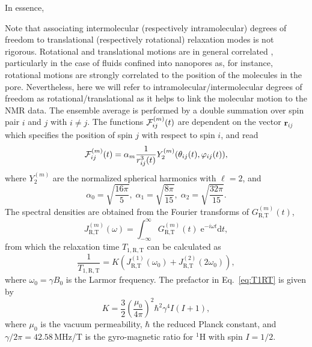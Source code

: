 In essence, 




Note that associating intermolecular (respectively intramolecular) 
degrees of freedom to translational (respectively rotational) relaxation modes
is not rigorous. Rotational and translational motions are in general correlated \cite{henritzi13a, becher21a, becher22a},
particularly in the case of fluids confined into nanopores as,
for instance, rotational motions are strongly correlated to the position of the 
molecules in the pore. Nevertheless, here we will refer to intramolecular/intermolecular
degrees of freedom as rotational/translational as it helps to link the molecular motion 
to the NMR data.
The ensemble average is performed by a double summation over spin pair $i$ and
$j$ with $i \ne j$.
The functions ${\cal F}_{ij}^{(m)} (t)$ are dependent on the vector
$\boldsymbol{r}_{ij}$ which specifies the position of spin $j$ with respect to
spin $i$, and read
\begin{equation}
{\cal F}_{ij}^{(m)} (t) = \alpha_m 
\dfrac{1}{r_{ij}^3 (t)}
Y^{(m)}_2 (\theta_{ij} (t), \varphi_{ij} (t)),
\label{eq:Fij}
\end{equation}
where $Y^{(m)}_2$ are the normalized spherical harmonics with $\ell = 2$, and
\begin{equation}
\alpha_0 = \sqrt{\dfrac{16 \pi}{5}}, \; \alpha_1 = \sqrt{\dfrac{8 \pi}{15}}, \;
\alpha_2 = \sqrt{\dfrac{32 \pi}{15}}.
\label{eq:alpha}
\end{equation}
The spectral densities are obtained from the Fourier transforms of $G^{(m)}_\text{R,T} (t)$,
\begin{equation}
J^{(m)}_\text{R,T} (\omega) = \int_{-\infty}^\infty G^{(m)}_\text{R,T} (t) \; 
\mathrm e^{-i \omega t} \mathrm d t,
\label{eq:JRT}
\end{equation}
from which the relaxation time $T_{1, \text{R}, \text{T}}$ can be calculated as
\begin{equation}
\dfrac{1}{T_{1, \text{R}, \text{T}}} = K \left(J^{(1)}_\text{R,T} (\omega_0) 
+ J^{(2)}_\text{R,T} (2 \omega_0) \right),
\label{eq:T1RT}
\end{equation}
where $\omega_0 = \gamma B_0$ is the Larmor frequency.
The prefactor in Eq.\ \eqref{eq:T1RT} is given by 
\begin{equation}
K = \dfrac{3}{2}\left(\dfrac{\mu_0}{4 \pi}\right)^2 \hbar^2 \gamma^4 I (I+1),
\end{equation}
where $\mu_0$ is the vacuum permeability, $\hbar$ the reduced Planck constant, 
and $\gamma/ 2 \pi = 42.58$\,MHz/T is the gyro-magnetic ratio for $^1$H with spin $I = 1/2$.
